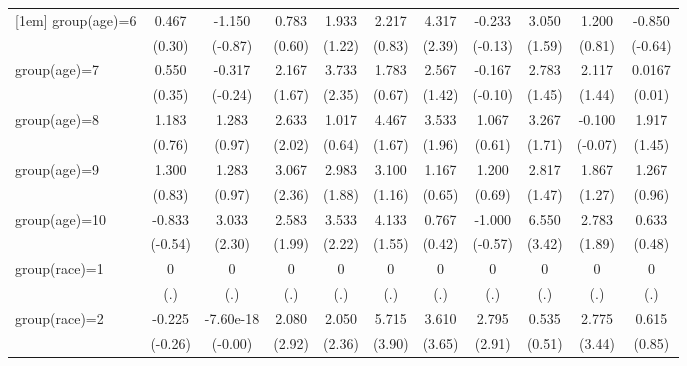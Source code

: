 \begin{table}[htbp]
\begin{tabular}{l*{10}{c}}
[1em]
group(age)=6        &       0.467&      -1.150&       0.783&       1.933&       2.217&       4.317&      -0.233&       3.050&       1.200&      -0.850\\
                    &      (0.30)&     (-0.87)&      (0.60)&      (1.22)&      (0.83)&      (2.39)&     (-0.13)&      (1.59)&      (0.81)&     (-0.64)\\
[1em]
group(age)=7        &       0.550&      -0.317&       2.167&       3.733&       1.783&       2.567&      -0.167&       2.783&       2.117&      0.0167\\
                    &      (0.35)&     (-0.24)&      (1.67)&      (2.35)&      (0.67)&      (1.42)&     (-0.10)&      (1.45)&      (1.44)&      (0.01)\\
[1em]
group(age)=8        &       1.183&       1.283&       2.633&       1.017&       4.467&       3.533&       1.067&       3.267&      -0.100&       1.917\\
                    &      (0.76)&      (0.97)&      (2.02)&      (0.64)&      (1.67)&      (1.96)&      (0.61)&      (1.71)&     (-0.07)&      (1.45)\\
[1em]
group(age)=9        &       1.300&       1.283&       3.067&       2.983&       3.100&       1.167&       1.200&       2.817&       1.867&       1.267\\
                    &      (0.83)&      (0.97)&      (2.36)&      (1.88)&      (1.16)&      (0.65)&      (0.69)&      (1.47)&      (1.27)&      (0.96)\\
[1em]
group(age)=10       &      -0.833&       3.033&       2.583&       3.533&       4.133&       0.767&      -1.000&       6.550&       2.783&       0.633\\
                    &     (-0.54)&      (2.30)&      (1.99)&      (2.22)&      (1.55)&      (0.42)&     (-0.57)&      (3.42)&      (1.89)&      (0.48)\\
[1em]
group(race)=1       &           0&           0&           0&           0&           0&           0&           0&           0&           0&           0\\
                    &         (.)&         (.)&         (.)&         (.)&         (.)&         (.)&         (.)&         (.)&         (.)&         (.)\\
[1em]
group(race)=2       &      -0.225&   -7.60e-18&       2.080&       2.050&       5.715&       3.610&       2.795&       0.535&       2.775&       0.615\\
                    &     (-0.26)&     (-0.00)&      (2.92)&      (2.36)&      (3.90)&      (3.65)&      (2.91)&      (0.51)&      (3.44)&      (0.85)\\

\end{tabular}
\end{table}
